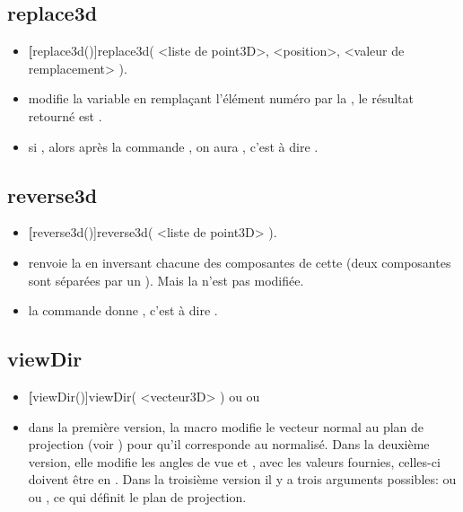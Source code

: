 \subsection{replace3d}
\begin{itemize}
 \item \util \textbf[replace3d()]{replace3d( <liste de point3D>, <position>, <valeur de remplacement> )}.
 \item \desc modifie la variable  en remplaçant l'élément numéro  par la , le résultat retourné est \Nil.
 \item \exem si , alors après la commande , on aura , c'est à dire .
\end{itemize}

\subsection{reverse3d}
\begin{itemize}
 \item \util \textbf[reverse3d()]{reverse3d( <liste de point3D> )}.
 \item \desc renvoie la  en inversant chacune des composantes de cette  (deux composantes sont séparées par un \jump). Mais la  n'est pas modifiée.
 \item \exem la commande  donne , c'est à dire .
\end{itemize}


\subsection{viewDir}
\begin{itemize}
 \item \util \textbf[viewDir()]{viewDir( <vecteur3D> )} ou  ou  
 \item \desc dans la première version, la macro modifie le vecteur normal au plan de projection (voir ) pour qu'il corresponde au  normalisé. Dans la deuxième version, elle modifie les angles de vue  et , avec les valeurs fournies, celles-ci doivent être en . Dans la troisième version il y a trois arguments possibles:  ou  ou , ce qui définit le plan de projection.
\end{itemize}

